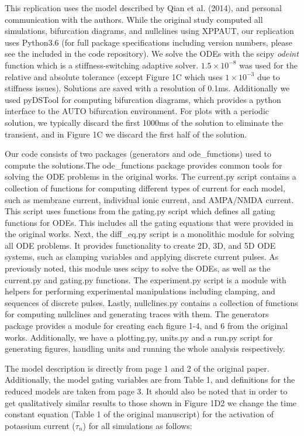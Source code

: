 This replication uses the model described by Qian et al. (2014), and personal communication with the authors. While the original study computed all simulations, bifurcation diagrams, and nullclines using XPPAUT, our replication uses Python3.6 (for full package specifications including version numbers, please see the included  in the code repository). We solve the ODEs with the scipy \emph{odeint} function which is a stiffness-switching adaptive solver. $1.5\times 10^{-8}$ was used for the relative and absolute tolerance (except Figure 1C which uses $1\times 10^{-3}$ due to stiffness issues). Solutions are saved with a resolution of 0.1ms. Additionally we used pyDSTool \cite{pydstool} for computing bifurcation diagrams, which provides a python interface to the AUTO bifurcation environment. For plots with a periodic solution, we typically discard the first 1000ms of the solution to eliminate the transient, and in Figure 1C we discard the first half of the solution. 

Our code consists of two packages (generators and ode\_functions) used to compute the solutions.The ode\_functions package provides common tools for solving the ODE problems in the original works. The current.py script contains a collection of functions for computing different types of current for each model, such as membrane current, individual ionic current, and AMPA/NMDA current. This script uses functions from the gating.py script which defines all gating functions for ODEs. This includes all the gating equations that were provided in the original works. Next, the diff\_eq.py script is a monolithic module for solving all ODE problems. It provides functionality to create 2D, 3D, and 5D ODE systems, such as clamping variables and applying discrete current pulses. As previously noted, this module uses scipy to solve the ODEs, as well as the current.py and gating.py functions. The experiment.py script is a module with helpers for performing experimental manipulations including clamping, and sequences of discrete pulses. Lastly, nullclines.py contains a collection of functions for computing nullclines and generating traces with them.
The generators package provides a module for creating each figure 1-4, and 6 from the original works. Additionally, we have a plotting.py, units.py and a run.py script for generating figures, handling units and running the whole analysis respectively. 

The model description is directly from page 1 and 2 of the original paper. Additionally, the model gating variables are from Table 1, and definitions for the reduced models are taken from page 3. It should also be noted that in order to get qualitatively similar results to those shown in Figure 1D2 we change the time constant equation (Table 1 of the original manuscript) for the activation of potassium current ($\tau_n$) for all simulations as follows:

